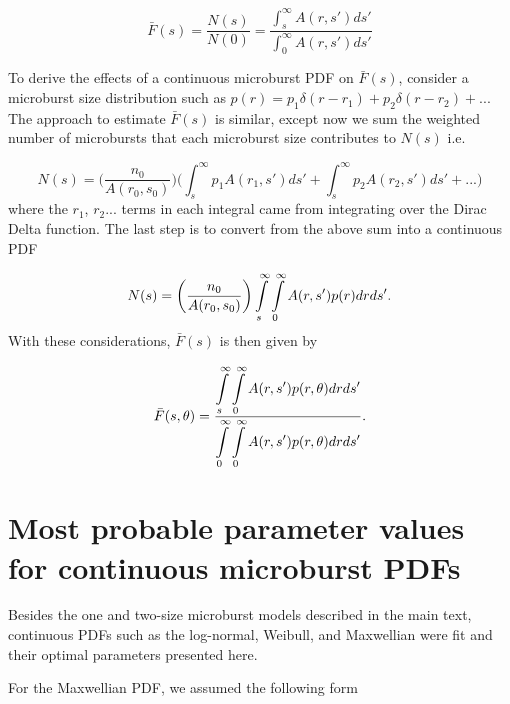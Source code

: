 \documentclass[draft]{agujournal2019}
\begin{document}
\begin{equation}
\bar{F}(s) = \frac{N(s)}{N(0)} = \frac{\int_{s}^\infty A(r, s') ds'}{\int_{0}^\infty A(r, s') ds'}
\end{equation}

To derive the effects of a continuous microburst PDF on $\bar{F}(s)$, consider a microburst size distribution such as $p(r) = p_1 \delta (r-r_1) + p_2 \delta (r-r_2) + ...$ The approach to estimate $\bar{F}(s)$ is similar, except now we sum the weighted number of microbursts that each microburst size contributes to $N(s)$ i.e.

\begin{equation}
N(s) = \bigg( \frac{n_0}{A(r_0, s_0)} \bigg) \bigg( \int_{s}^\infty p_1 A(r_1, s') ds' + \int_{s}^\infty p_2 A(r_2, s') ds' + ...\bigg)
\end{equation} where the $r_1$, $r_2$... terms in each integral came from integrating over the Dirac Delta function. The last step is to convert from the above sum into a continuous PDF

\begin{equation}
N(s) = \bigg( \frac{n_0}{A(r_0, s_0)} \bigg) \displaystyle\int\displaylimits_{s}^{\infty} \displaystyle\int\displaylimits_0^{\infty} A(r, s') p(r) dr ds'.
\end{equation} With these considerations, $\bar{F}(s)$ is then given by 

\begin{equation} \label{analytic_integral}
\bar{F}(s, \theta) = \frac{\displaystyle\int\displaylimits_{s}^{\infty} \displaystyle\int\displaylimits_0^{\infty} A(r, s') p(r, \theta) dr ds'}{\displaystyle\int\displaylimits_{0}^{\infty} \displaystyle\int\displaylimits_0^{\infty} A(r, s') p(r, \theta) dr ds'}.
\end{equation}

\section{Most probable parameter values for continuous microburst PDFs} \label{appendixc}
Besides the one and two-size microburst models described in the main text, continuous PDFs such as the log-normal, Weibull, and Maxwellian were fit and their optimal parameters presented here.

For the Maxwellian PDF, we assumed the following form
\end{document}
